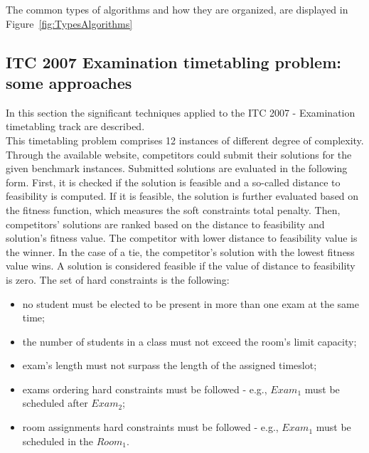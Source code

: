 The common types of algorithms and how they are organized, are displayed in Figure~\ref{fig:TypesAlgorithms}


\subsection{ITC 2007 Examination timetabling problem: some approaches}
\label{subsection:ApprITC2007}

In this section the significant techniques applied to the ITC 2007 - Examination timetabling track are described. \\
This timetabling problem comprises 12 instances of different degree of complexity. Through the available website, competitors could submit their solutions for the given benchmark instances. Submitted solutions are evaluated in the following form. First, it is checked if the solution is feasible and a so-called distance to feasibility is computed. If it is feasible, the solution is further evaluated based on the fitness function, which measures the soft constraints total penalty. Then, competitors' solutions are ranked based on the distance to feasibility and solution's fitness value. The competitor with lower distance to feasibility value is the winner. In the case of a tie, the competitor's solution with the lowest fitness value wins. A solution is considered feasible if the value of distance to feasibility is zero. The set of hard constraints is the following:
\begin{itemize}
	\item no student must be elected to be present in more than one exam at the same time;
	\item the number of students in a class must not exceed the room's limit capacity;
	\item exam's length must not surpass the length of the assigned timeslot;
	\item exams ordering hard constraints must be followed - e.g., $Exam_1$ must be scheduled after $Exam_2$;
	\item room assignments hard constraints must be followed - e.g., 	$Exam_1$ must be scheduled in the $Room_1$.
\end{itemize}

